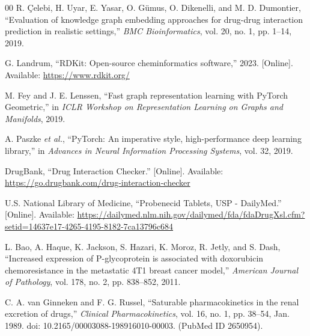 \documentclass[conference]{IEEEtran}
\begin{document}
\begin{thebibliography}{00}
R. \c{C}elebi, H. Uyar, E. Yasar, O. G\"{u}mus, O. Dikenelli, and M. D. Dumontier, ``Evaluation of knowledge graph embedding approaches for drug-drug interaction prediction in realistic settings,'' \textit{BMC Bioinformatics}, vol. 20, no. 1, pp. 1--14, 2019.

G. Landrum, ``RDKit: Open-source cheminformatics software,'' 2023. [Online]. Available: \url{https://www.rdkit.org/}

M. Fey and J. E. Lenssen, ``Fast graph representation learning with PyTorch Geometric,'' in \textit{ICLR Workshop on Representation Learning on Graphs and Manifolds}, 2019.

A. Paszke \textit{et al.}, ``PyTorch: An imperative style, high-performance deep learning library,'' in \textit{Advances in Neural Information Processing Systems}, vol. 32, 2019.

DrugBank, ``Drug Interaction Checker.'' [Online]. Available: \url{https://go.drugbank.com/drug-interaction-checker}

U.S. National Library of Medicine, ``Probenecid Tablets, USP - DailyMed.'' [Online]. Available: \url{https://dailymed.nlm.nih.gov/dailymed/fda/fdaDrugXsl.cfm?setid=14637e17-4265-4195-8182-7ca13796c684}

L. Bao, A. Haque, K. Jackson, S. Hazari, K. Moroz, R. Jetly, and S. Dash, ``Increased expression of P-glycoprotein is associated with doxorubicin chemoresistance in the metastatic 4T1 breast cancer model,'' \textit{American Journal of Pathology}, vol. 178, no. 2, pp. 838--852, 2011.

C. A. van Ginneken and F. G. Russel, ``Saturable pharmacokinetics in the renal excretion of drugs,'' \textit{Clinical Pharmacokinetics}, vol. 16, no. 1, pp. 38--54, Jan. 1989. doi: 10.2165/00003088-198916010-00003. (PubMed ID 2650954).


\end{thebibliography}
\end{document}

